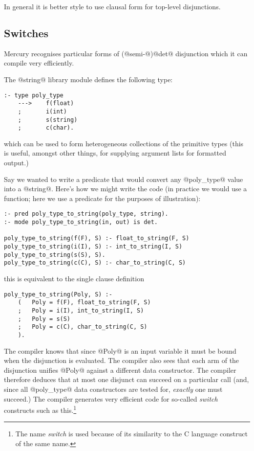 \documentclass[a4paper,11pt,notitlepage,onecolumn]{article}
\begin{document}
In general it is better style to use clausal form for
top-level disjunctions.

\subsection{Switches}
Mercury recognises particular forms of (@semi-@)@det@
disjunction which it can compile very efficiently.

The @string@ library module defines the following type:
\begin{verbatim}
:- type poly_type
    --->    f(float)
    ;       i(int)
    ;       s(string)
    ;       c(char).
\end{verbatim}
which can be used to form heterogeneous collections of the
primitive types (this is useful, amongst other things, for
supplying argument lists for formatted output.)

Say we wanted to write a predicate that would convert any
@poly_type@ value into a @string@.  Here's how we might write the
code (in practice we would use a function; here we use a
predicate for the purposes of illustration):
\begin{verbatim}
:- pred poly_type_to_string(poly_type, string).
:- mode poly_type_to_string(in, out) is det.

poly_type_to_string(f(F), S) :- float_to_string(F, S)
poly_type_to_string(i(I), S) :- int_to_string(I, S)
poly_type_to_string(s(S), S).
poly_type_to_string(c(C), S) :- char_to_string(C, S)
\end{verbatim}
this is equivalent to the single clause definition
\begin{verbatim}
poly_type_to_string(Poly, S) :-
    (   Poly = f(F), float_to_string(F, S)
    ;   Poly = i(I), int_to_string(I, S)
    ;   Poly = s(S)
    ;   Poly = c(C), char_to_string(C, S)
    ).
\end{verbatim}

The compiler knows that since @Poly@ is an input variable it
must be bound when the disjunction is evaluated.  The compiler
also sees that each arm of the disjunction unifies @Poly@
against a different data constructor.  The compiler therefore
deduces that at most one disjunct can succeed on a particular
call (and, since all @poly_type@ data constructors are tested
for, \emph{exactly} one must succeed.)  The compiler generates very
efficient code for so-called \emph{switch} constructs such as this.\footnote{The name \emph{switch} is used because of its similarity
to the C language construct of the same name.}
\end{document}
